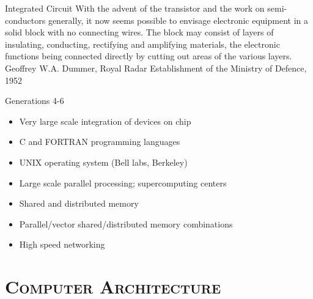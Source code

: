 \documentclass[xcolor=x11names,compress]{beamer}
\renewcommand{\(}{\begin{columns}}
\renewcommand{\)}{\end{columns}}
\newcommand{\<}[1]{\begin{column}{#1}}
\renewcommand{\>}{\end{column}}
\begin{document}
\begin{frame}{Integrated Circuit}
With the advent of the \alert{transistor} and the work on semi-conductors generally, it now seems possible to envisage electronic equipment in a solid block with no connecting wires. The block may consist of layers of insulating, conducting, rectifying and amplifying materials, the \alert{electronic functions being connected directly} by cutting out areas of the various layers.\\
\vspace*{1.5 em}
\hspace*{0.5 in}Geoffrey W.A. Dummer, Royal Radar Establishment of the Ministry of Defence, 1952

\end{frame}

\begin{frame}{Generations 4-6}
\begin{itemize}
\item Very large scale integration of devices on chip \vspace*{0.5 em}
\item C and FORTRAN programming languages\vspace*{0.5 em}
\item \alert{UNIX} operating system (Bell labs, Berkeley)\vspace*{0.5 em}
\item Large scale parallel processing; supercomputing centers\vspace*{0.5 em}
\item Shared and distributed memory\vspace*{0.5 em}
\item Parallel/vector shared/distributed memory combinations\vspace*{0.5 em}
\item High speed networking
\end{itemize}
\end{frame}

\section{\scshape Computer Architecture}
\end{document}
